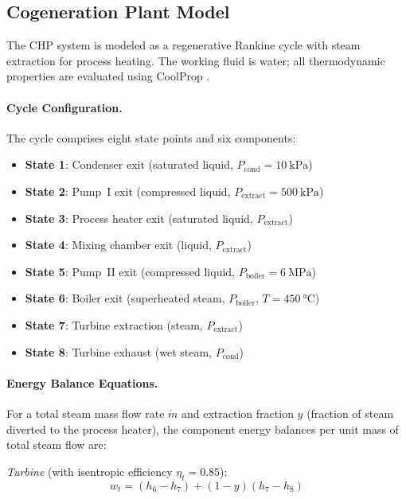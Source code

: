 \documentclass[12pt, letterpaper]{article}
\begin{document}
\subsection{Cogeneration Plant Model}

The CHP system is modeled as a regenerative Rankine cycle with steam extraction for process heating. The working fluid is water; all thermodynamic properties are evaluated using CoolProp \citep{coolprop}.

\paragraph{Cycle Configuration.}
The cycle comprises eight state points and six components:
\begin{itemize}[noitemsep]
  \item \textbf{State 1}: Condenser exit (saturated liquid, $P_\text{cond} = \SI{10}{\kilo\pascal}$)
  \item \textbf{State 2}: Pump~I exit (compressed liquid, $P_\text{extract} = \SI{500}{\kilo\pascal}$)
  \item \textbf{State 3}: Process heater exit (saturated liquid, $P_\text{extract}$)
  \item \textbf{State 4}: Mixing chamber exit (liquid, $P_\text{extract}$)
  \item \textbf{State 5}: Pump~II exit (compressed liquid, $P_\text{boiler} = \SI{6}{\mega\pascal}$)
  \item \textbf{State 6}: Boiler exit (superheated steam, $P_\text{boiler}$, $T = \SI{450}{\celsius}$)
  \item \textbf{State 7}: Turbine extraction (steam, $P_\text{extract}$)
  \item \textbf{State 8}: Turbine exhaust (wet steam, $P_\text{cond}$)
\end{itemize}

\paragraph{Energy Balance Equations.}
For a total steam mass flow rate $\dot{m}$ and extraction fraction $y$ (fraction of steam diverted to the process heater), the component energy balances per unit mass of total steam flow are:

\textit{Turbine} (with isentropic efficiency $\eta_t = 0.85$):
\begin{equation}
  w_t = (h_6 - h_7) + (1-y)(h_7 - h_8)
  \label{eq:w_turbine}
\end{equation}
\end{document}
